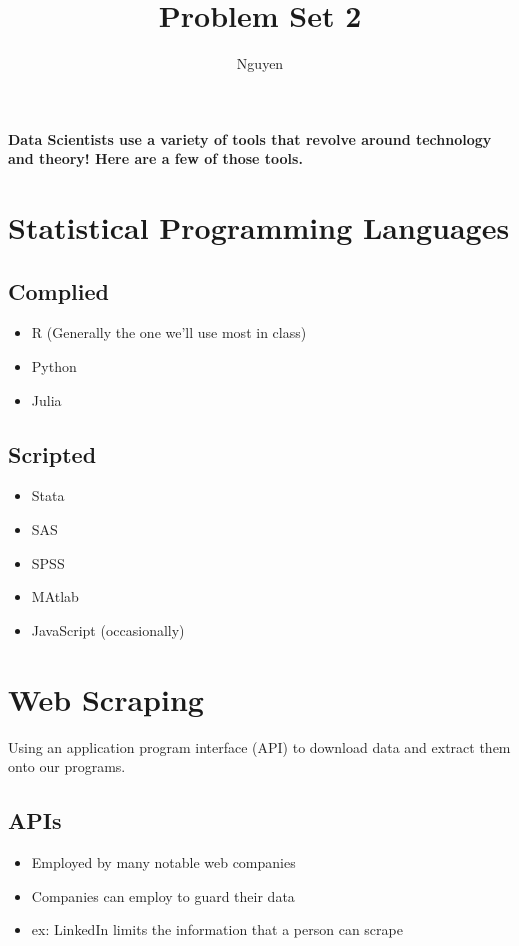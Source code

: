 \documentclass{article}
\title{Problem Set 2}
\author{Nguyen}
\begin{document}
\maketitle{}

\paragraph{Data Scientists use a variety of tools that revolve around technology and theory! Here are a few of those tools.}

\section{Statistical Programming Languages}
\subsection{Complied}
    \begin{itemize}
        \item R (Generally the one we'll use most in class)
        \item Python 
        \item Julia
    \end{itemize} %

\subsection{Scripted}
    \begin{itemize}
        \item Stata
        \item SAS 
        \item SPSS 
        \item MAtlab
        \item JavaScript (occasionally)
    \end{itemize}

\section{Web Scraping}
    Using an application program interface (API) to download data and extract them onto our programs. 

\subsection{APIs}
\begin{itemize}
    \item Employed by many notable web companies
    \item Companies can employ to guard their data
    \item ex: LinkedIn limits the information that a person can scrape
\end{itemize}
\end{document}
